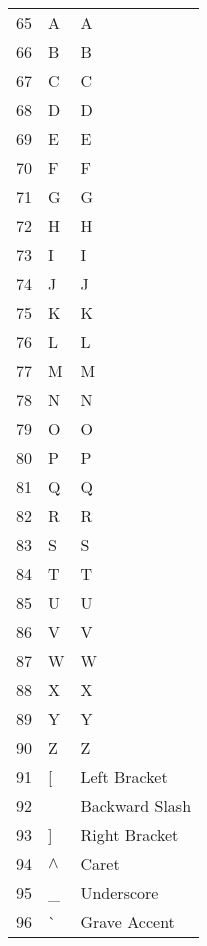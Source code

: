 \begin{description}
\begin{longtable}{lll}
      65 & A & A \\
      66 & B & B \\
      67 & C & C \\
      68 & D & D \\
      69 & E & E \\
      70 & F & F \\
      71 & G & G \\
      72 & H & H \\
      73 & I & I \\
      74 & J & J \\
      75 & K & K \\
      76 & L & L \\
      77 & M & M \\
      78 & N & N \\
      79 & O & O \\
      80 & P & P \\
      81 & Q & Q \\
      82 & R & R \\
      83 & S & S \\
      84 & T & T \\
      85 & U & U \\
      86 & V & V \\
      87 & W & W \\
      88 & X & X \\
      89 & Y & Y \\
      90 & Z & Z \\

      91 & [ & Left Bracket \\
      92 & \ & Backward Slash \\
      93 & ] & Right Bracket \\
      94 & $\wedge$ & Caret  \\
      95 & \_ & Underscore  \\
      96 & \`{} & Grave Accent   \\



\end{longtable}
\end{description}
